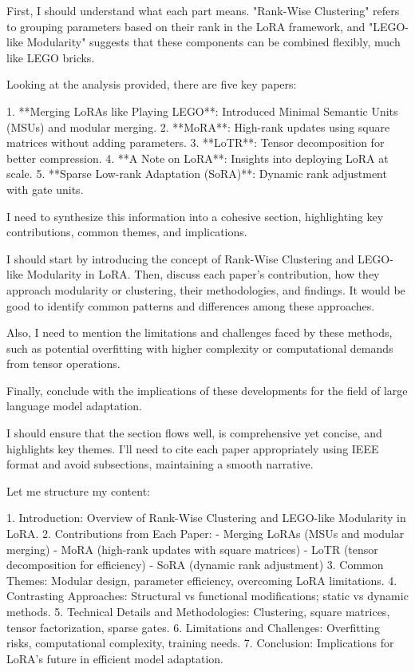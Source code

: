 \documentclass[conference]{IEEEtran}
\begin{document}
First, I should understand what each part means. "Rank-Wise Clustering" refers to grouping parameters based on their rank in the LoRA framework, and "LEGO-like Modularity" suggests that these components can be combined flexibly, much like LEGO bricks.

Looking at the analysis provided, there are five key papers:

1. **Merging LoRAs like Playing LEGO**: Introduced Minimal Semantic Units (MSUs) and modular merging.
2. **MoRA**: High-rank updates using square matrices without adding parameters.
3. **LoTR**: Tensor decomposition for better compression.
4. **A Note on LoRA**: Insights into deploying LoRA at scale.
5. **Sparse Low-rank Adaptation (SoRA)**: Dynamic rank adjustment with gate units.

I need to synthesize this information into a cohesive section, highlighting key contributions, common themes, and implications.

I should start by introducing the concept of Rank-Wise Clustering and LEGO-like Modularity in LoRA. Then, discuss each paper's contribution, how they approach modularity or clustering, their methodologies, and findings. It would be good to identify common patterns and differences among these approaches.

Also, I need to mention the limitations and challenges faced by these methods, such as potential overfitting with higher complexity or computational demands from tensor operations.

Finally, conclude with the implications of these developments for the field of large language model adaptation.

I should ensure that the section flows well, is comprehensive yet concise, and highlights key themes. I'll need to cite each paper appropriately using IEEE format and avoid subsections, maintaining a smooth narrative.

Let me structure my content:

1. Introduction: Overview of Rank-Wise Clustering and LEGO-like Modularity in LoRA.
2. Contributions from Each Paper:
   - Merging LoRAs (MSUs and modular merging)
   - MoRA (high-rank updates with square matrices)
   - LoTR (tensor decomposition for efficiency)
   - SoRA (dynamic rank adjustment)
3. Common Themes: Modular design, parameter efficiency, overcoming LoRA limitations.
4. Contrasting Approaches: Structural vs functional modifications; static vs dynamic methods.
5. Technical Details and Methodologies: Clustering, square matrices, tensor factorization, sparse gates.
6. Limitations and Challenges: Overfitting risks, computational complexity, training needs.
7. Conclusion: Implications for LoRA's future in efficient model adaptation.
\end{document}
